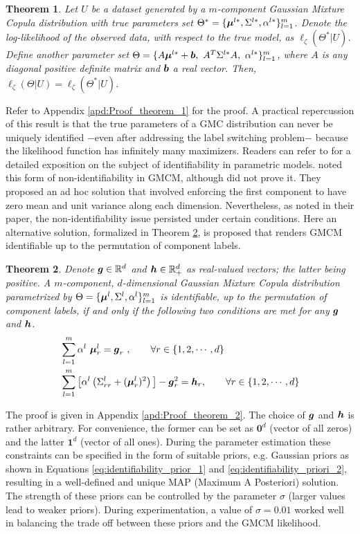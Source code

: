 \documentclass{article}
\theoremstyle{plain}
\newtheorem{theorem}{Theorem}[section]
\theoremstyle{definition}
\theoremstyle{remark}
\begin{document}
\begin{theorem}
\label{thm:theorem1}
 Let $U$ be a dataset generated by a $m$-component Gaussian Mixture Copula distribution with true parameters set $\Theta^* = \{\boldsymbol{\mu}^{l*}, \Sigma^{l*}, \alpha^{l*}\}_{l=1}^m$. Denote the log-likelihood of the observed data, with respect to the true model, as $\ell_\zeta(\Theta^*|U)$. Define another parameter set $\Theta= \{A\bs{\mu}^{l*}+\bs{b}, \ A^T\Sigma^{l*}A, \ \alpha^{l*}\}_{l=1}^m$, where $A$ is any diagonal positive definite matrix and $\boldsymbol{b}$ a real vector. Then, $\ell_\zeta(\Theta|U) = \ell_\zeta(\Theta^*|U)$.
\end{theorem}
Refer to Appendix \ref{apd:Proof_theorem_1} for the proof. A practical repercussion of this result is that the true parameters of a GMC distribution can never be uniquely identified $-$even after addressing the label switching problem$-$ because the likelihood function has infinitely many maximizers. Readers can refer to \citet{White1982} for a detailed exposition on the subject of identifiability in parametric models. \citet{Bilgrau2016} noted this form of non-identifiability in GMCM, although did not prove it. They proposed an ad hoc solution that involved enforcing the first component to have zero mean and unit variance along each dimension. Nevertheless, as noted in their paper, the non-identifiability issue persisted under certain conditions. Here an alternative solution, formalized in Theorem \ref{thm:theorem2}, is proposed that renders GMCM identifiable up to the permutation of component labels.
\begin{theorem}
\label{thm:theorem2} 
Denote $\boldsymbol{g}\in \mathbb{R}^d$ and $\boldsymbol{h}\in \mathbb{R}_+^d$ as real-valued vectors; the latter being positive. A $m$-component, $d$-dimensional Gaussian Mixture Copula distribution parametrized by $\Theta = \{\boldsymbol{\mu}^l, \Sigma^l, \alpha^l\}_{l=1}^m$ is identifiable, up to the permutation of component labels, if and only if the following two conditions are met for any $\boldsymbol{g}$ and $\boldsymbol{h}$.
\begin{align}
&\sum_{l=1}^m \alpha^l \ \boldsymbol{\mu}_r^l=\boldsymbol{g}_r \ ,\qquad \forall r \in \{1,2,\cdots,d\} \label{eq:identifiability_constraint_1} \\
&\sum_{l=1}^m \big[ \alpha^l \left(\Sigma_{rr}^l+(\boldsymbol{\mu}_r^l)^2\right)\big] -\boldsymbol{g}_r^2 =\boldsymbol{h}_r ,\qquad \forall r \in \{1,2,\cdots,d\}\label{eq:identifiability_constraint_2}
\end{align}
\end{theorem}
The proof is given in Appendix \ref{apd:Proof_theorem_2}. The choice of $\boldsymbol{g}$ and $\boldsymbol{h}$ is rather arbitrary. For convenience, the former can be set as $\mathbf{0}^d$ (vector of all zeros) and the latter $\mathbf{1}^d$ (vector of all ones). During the parameter estimation these constraints can be specified in the form of suitable priors, e.g. Gaussian priors as shown in Equations \eqref{eq:identifiability_prior_1} and \eqref{eq:identifiability_priori_2}, resulting in a well-defined and unique MAP (Maximum A Posteriori) solution. The strength of these priors can be controlled by the parameter $\sigma$ (larger values lead to weaker priors). During experimentation, a value of $\sigma=0.01$ worked well in balancing the trade off between these priors and the GMCM likelihood.
\end{document}
